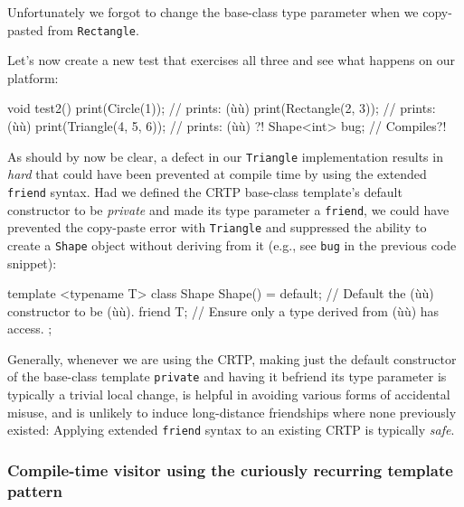 \noindent Unfortunately we forgot to change the base-class type parameter when we
copy-pasted from \lstinline!Rectangle!.

Let's now create a new test that exercises all three and see what
happens on our platform:

\begin{emcppslisting}[emcppsbatch=e7]
void test2()
{
    print(Circle(1));          // prints: (ù{}ù)
    print(Rectangle(2, 3));    // prints: (ù{}ù)
    print(Triangle(4, 5, 6));  // prints: (ù{}ù) ?!
    Shape<int> bug;            // Compiles?!
}
\end{emcppslisting}
    
\noindent As should by now be clear, a defect in our \lstinline!Triangle!
implementation results in \emph{hard}  that
could have been prevented at compile time by using the extended
\lstinline!friend! syntax. Had we defined the CRTP base-class template's
default constructor to be \emph{private} and made its type parameter a
\lstinline!friend!, we could have prevented the copy-paste error with
\lstinline!Triangle! and suppressed the ability to create a \lstinline!Shape!
object without deriving from it (e.g., see \lstinline!bug! in the previous
code snippet):

\begin{emcppslisting}[emcppsbatch=e8]
template <typename T>
class Shape
{
    Shape() = default;  // Default the (ù{}ù) constructor to be (ù{}ù).
    friend T;           // Ensure only a type derived from (ù{}ù) has access.
};
\end{emcppslisting}
    
\noindent Generally, whenever we are using the CRTP, making just the
default constructor of the base-class template \lstinline!private! and
having it befriend its type parameter is typically a trivial local
change, is helpful in avoiding various forms of accidental misuse, and
is unlikely to induce long-distance friendships where none previously
existed: Applying extended \lstinline!friend! syntax to an existing CRTP
is typically \emph{safe}.

\subsubsection[Compile-time visitor using the curiously recurring template pattern]{Compile-time visitor using the curiously recurring template pattern}\label{compile-time-visitor-using-crtp}

